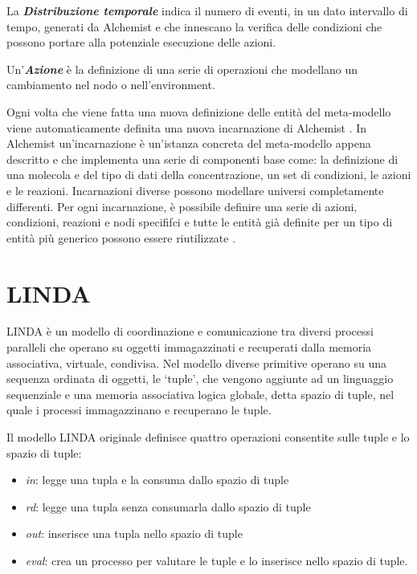 La \textbf{\textit{Distribuzione temporale}} indica il numero di eventi, in un dato intervallo di tempo, generati da Alchemist e che innescano la verifica delle condizioni che possono portare alla potenziale esecuzione delle azioni.

Un'\textbf{\textit{Azione}} è la definizione di una serie di operazioni che modellano un cambiamento nel nodo o nell'environment.

Ogni volta che viene fatta una nuova definizione delle entità del meta-modello viene automaticamente definita una nuova incarnazione di Alchemist \cite{alchemist-jos2013}.
In Alchemist un'incarnazione è un'istanza concreta del meta-modello appena descritto e che implementa una serie di componenti base come: la definizione di una molecola e del tipo di dati della concentrazione, un set di condizioni, le azioni e le reazioni. Incarnazioni diverse possono modellare universi completamente differenti.
Per ogni incarnazione, è possibile definire una serie di azioni, condizioni, reazioni e nodi specififci e tutte le entità già definite per un tipo di entità più generico possono essere riutilizzate \cite{alchemist-jos2013}.



\section{LINDA}
LINDA è un modello di coordinazione e comunicazione tra diversi processi paralleli che operano su oggetti immagazzinati e recuperati dalla memoria associativa, virtuale, condivisa. Nel modello diverse primitive operano su una sequenza ordinata di oggetti, le `tuple', che vengono aggiunte ad un linguaggio sequenziale e una memoria associativa logica globale, detta spazio di tuple, nel quale i processi immagazzinano e recuperano le tuple.

Il modello LINDA originale definisce quattro operazioni consentite sulle tuple e lo spazio di tuple:
\begin{itemize}
\item \textit{in}: legge una tupla e la consuma dallo spazio di tuple
\item \textit{rd}: legge una tupla senza consumarla dallo spazio di tuple
\item \textit{out}: inserisce una tupla nello spazio di tuple
\item \textit{eval}: crea un processo per valutare le tuple e lo inserisce nello spazio di tuple.
\end{itemize}

